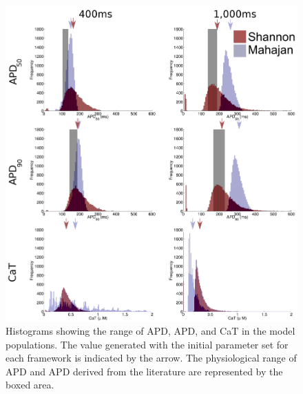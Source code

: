 \documentclass[../thesis-main.tex]{subfiles}
\begin{document}
\begin{figure}
 \centering
 \includegraphics[width=\textwidth]{biomarker-rateEffect}
 \caption[Rate dependence of biomarkers in the parameter space.]{Histograms showing the range of APD, APD, and CaT in the model populations. The value generated with the initial parameter set for each framework is indicated by the arrow. The physiological range of APD and APD derived from the literature are represented by the boxed area.}
 \label{fig:biomarker-rateEffect}
\end{figure}

\biblio
\end{document}
